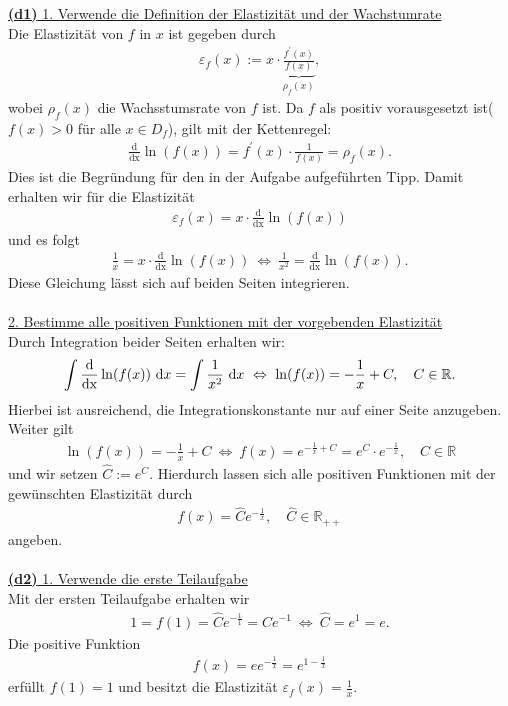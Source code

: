 \underline{\textbf{(d1)} 1. Verwende die Definition der Elastizität und der Wachstumrate}\\
Die Elastizität von $ f $ in $ x $ ist gegeben durch
\begin{align*}
	\varepsilon_f(x) := x \cdot \underbrace{\frac{f^\prime(x)}{f(x)}}_{\rho_f(x)},
\end{align*} 
wobei $ \rho_f(x) $ die Wachsstumsrate von $ f $ ist. 
Da $ f $ als positiv vorausgesetzt ist($ f(x) > 0$ für alle $ x \in D_f $), gilt mit der Kettenregel:
\begin{align*}
	\frac{\mathrm{d}}{\mathrm{dx}}\ln(f(x))
	=f^\prime(x) \cdot \frac{1}{f(x)} = \rho_f(x).
\end{align*}
Dies ist die Begründung für den in der Aufgabe aufgeführten Tipp. Damit erhalten wir für die Elastizität
\begin{align*}
	\varepsilon_f(x) = x \cdot \frac{\mathrm{d}}{\mathrm{dx}}\ln(f(x))
\end{align*} 
und es folgt
\begin{align*}
	\frac{1}{x} =  x \cdot \frac{\mathrm{d}}{\mathrm{dx}}\ln(f(x))
	\ \Leftrightarrow \
	\frac{1}{x^2} = \frac{\mathrm{d}}{\mathrm{dx}}\ln(f(x)).
\end{align*}
Diese Gleichung lässt sich auf beiden Seiten integrieren.\\
\\
\underline{2. Bestimme alle positiven Funktionen mit der vorgebenden Elastizität}\\
Durch Integration beider Seiten erhalten wir:
\begin{align*}
	\int \frac{\mathrm{d}}{\mathrm{dx}}\ln(f(x)) \ \text{\rmfamily d} x
	=
	\int \frac{1}{x^2} \ \text{\rmfamily d} x
	\ \Leftrightarrow \
	\ln(f(x)) = - \frac{1}{x} + C, \quad C \in \mathbb{R}.
\end{align*}
Hierbei ist ausreichend, die Integrationskonstante nur auf einer Seite anzugeben. Weiter gilt
\begin{align*}
	\ln(f(x)) = - \frac{1}{x} + C
	\ \Leftrightarrow \
	f(x) = e^{-\frac{1}{x} + C} = e^C \cdot e^{-\frac{1}{x}} , \quad C \in \mathbb{R}
\end{align*}
und wir setzen $ \hat{C} := e^{C} $. Hierdurch lassen sich alle positiven Funktionen mit der gewünschten Elastizität durch
\begin{align*}
	f(x) = \hat{C} e^{-\frac{1}{x}}, \quad \hat{C} \in \mathbb{R}_{++}
\end{align*}
angeben.\\
\\
\underline{\textbf{(d2)} 1. Verwende die erste Teilaufgabe}\\
Mit der ersten Teilaufgabe erhalten wir
\begin{align*}
	1 =f(1) = \hat{C} e^{-\frac{1}{1} } = \hat{C} e^{-1}
	\ \Leftrightarrow \
	\hat{C} =e^{1} = e.
\end{align*}
Die positive Funktion
\begin{align*}
	f(x) = e e^{-\frac{1}{x}} = e^{1-\frac{1}{x}} 
\end{align*}
erfüllt $ f(1)  = 1$ und besitzt die Elastizität $ \varepsilon_f(x) = \frac{1}{x} $.

\newpage

